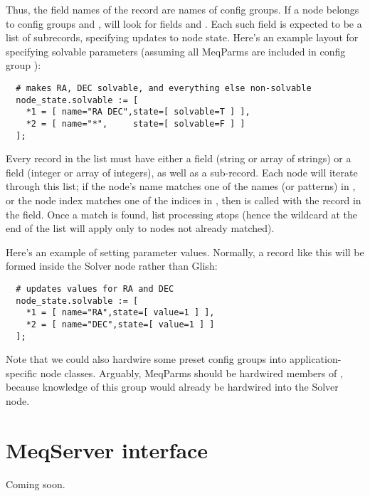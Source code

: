 \documentclass[10pt]{article}
\begin{document}
  Thus, the field names of the  record are names of config
  groups. If a node belongs to config groups  and ,
   will look for fields  and
  . Each such field is expected to be a list of subrecords,
  specifying updates to node state. Here's an example layout for specifying
  solvable parameters (assuming all MeqParms are included in config group
  ):

\begin{verbatim}
  # makes RA, DEC solvable, and everything else non-solvable
  node_state.solvable := [
    *1 = [ name="RA DEC",state=[ solvable=T ] ],
    *2 = [ name="*",     state=[ solvable=F ] ]
  ];
\end{verbatim}

  Every record in the list must have either a  field (string or array
  of strings) or a  field (integer or array of integers), as well
  as a  sub-record. Each node will iterate through this list; if
  the node's name matches one of the names (or patterns) in , or the
  node index matches one of the indices in , then 
  is called with the record in the  field. Once a match is found,
  list processing stops (hence the wildcard at the end of the list will apply 
  only to nodes not already matched).
  
  Here's an example of setting parameter values. Normally, a record like this
  will be formed inside the Solver node rather than Glish:

\begin{verbatim}
  # updates values for RA and DEC
  node_state.solvable := [
    *1 = [ name="RA",state=[ value=1 ] ],
    *2 = [ name="DEC",state=[ value=1 ] ]
  ];
\end{verbatim}  
  
  Note that we could also hardwire some preset config groups into
  application-specific node classes. Arguably, MeqParms should be hardwired
  members of , because knowledge of this group would already be
  hardwired into the Solver node.
  
\section{MeqServer interface}

Coming soon.
\end{document}
